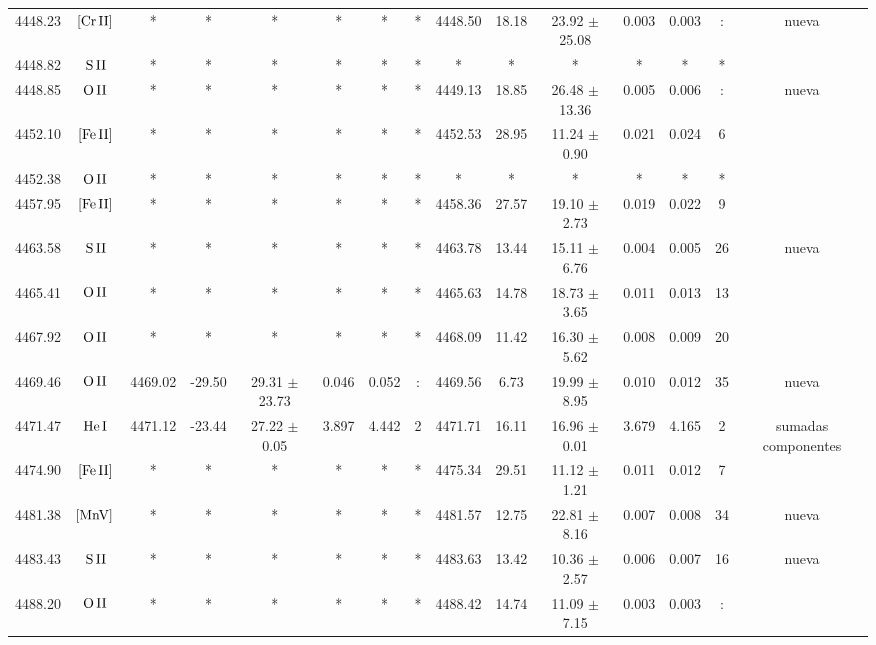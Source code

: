\documentclass{article}
\begin{document}
\begin{table*}
\begin{adjustbox}{width=\textwidth}
\begin{tabular}{ccccccccccccccc}
4448.23 & $\mbox{[Cr}\thinspace \mbox{II]}$ & * & * & * & * & * & * & 4448.50 & 18.18 & 23.92 $\pm$ 25.08 & 0.003 & 0.003 & : &  nueva \\
4448.82 & $\mbox{S}\thinspace \mbox{II}$ & * & * & * & * & * & * & * & * & * & * & * & * &  \\
4448.85 & $\mbox{O}\thinspace \mbox{II}$ & * & * & * & * & * & * & 4449.13 & 18.85 & 26.48 $\pm$ 13.36 & 0.005 & 0.006 & : &  nueva \\
4452.10 & $\mbox{[Fe}\thinspace \mbox{II]}$ & * & * & * & * & * & * & 4452.53 & 28.95 & 11.24 $\pm$ 0.90 & 0.021 & 0.024 & 6 &  \\
4452.38 & $\mbox{O}\thinspace \mbox{II}$ & * & * & * & * & * & * & * & * & * & * & * & * &  \\
4457.95 & $\mbox{[Fe}\thinspace \mbox{II]}$ & * & * & * & * & * & * & 4458.36 & 27.57 & 19.10 $\pm$ 2.73 & 0.019 & 0.022 & 9 &  \\
4463.58 & $\mbox{S}\thinspace \mbox{II}$ & * & * & * & * & * & * & 4463.78 & 13.44 & 15.11 $\pm$ 6.76 & 0.004 & 0.005 & 26 &  nueva \\
4465.41 & $\mbox{O}\thinspace \mbox{II}$ & * & * & * & * & * & * & 4465.63 & 14.78 & 18.73 $\pm$ 3.65 & 0.011 & 0.013 & 13 &  \\
4467.92 & $\mbox{O}\thinspace \mbox{II}$ & * & * & * & * & * & * & 4468.09 & 11.42 & 16.30 $\pm$ 5.62 & 0.008 & 0.009 & 20 &  \\
4469.46 & $\mbox{O}\thinspace \mbox{II}$ & 4469.02 & -29.50 & 29.31 $\pm$ 23.73 & 0.046 & 0.052 & : & 4469.56 & 6.73 & 19.99 $\pm$ 8.95 & 0.010 & 0.012 & 35 &  nueva \\
4471.47 & $\mbox{He}\thinspace \mbox{I}$ & 4471.12 & -23.44 & 27.22 $\pm$ 0.05 & 3.897 & 4.442 & 2 & 4471.71 & 16.11 & 16.96 $\pm$ 0.01 & 3.679 & 4.165 & 2 &  sumadas componentes \\
4474.90 & $\mbox{[Fe}\thinspace \mbox{II]}$ & * & * & * & * & * & * & 4475.34 & 29.51 & 11.12 $\pm$ 1.21 & 0.011 & 0.012 & 7 &  \\
4481.38 & $\mbox{[MnV]}\thinspace \mbox{}$ & * & * & * & * & * & * & 4481.57 & 12.75 & 22.81 $\pm$ 8.16 & 0.007 & 0.008 & 34 &  nueva \\
4483.43 & $\mbox{S}\thinspace \mbox{II}$ & * & * & * & * & * & * & 4483.63 & 13.42 & 10.36 $\pm$ 2.57 & 0.006 & 0.007 & 16 &  nueva \\
4488.20 & $\mbox{O}\thinspace \mbox{II}$ & * & * & * & * & * & * & 4488.42 & 14.74 & 11.09 $\pm$ 7.15 & 0.003 & 0.003 & : &  \\

\end{tabular}
\end{adjustbox}
\end{table*}
\end{document}
